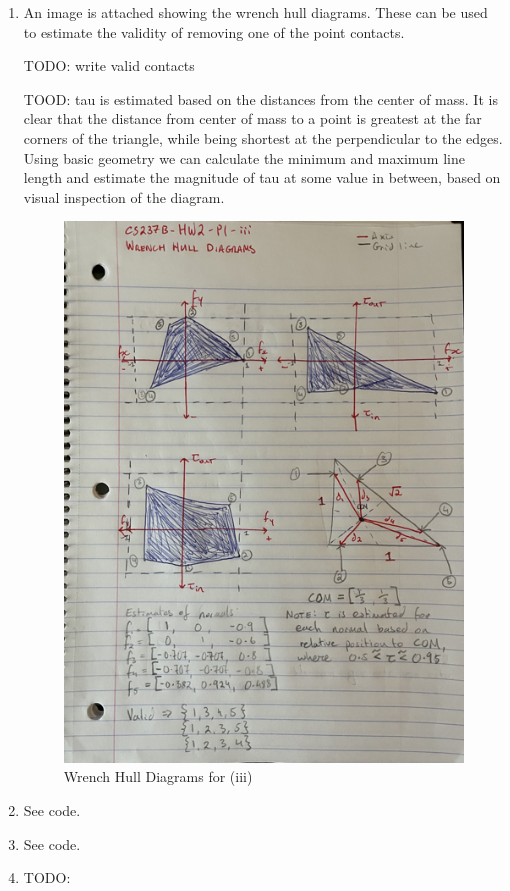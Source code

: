 \documentclass{article}
\begin{document}
\begin{enumerate}[label=(\roman*)]
\item An image is attached showing the wrench hull diagrams. These can be used to estimate the validity of removing one of the point contacts. 

TODO: write valid contacts

TOOD: tau is estimated based on the distances from the center of mass. It is clear that the distance from center of mass to a point is greatest at the far corners of the triangle, while being shortest at the perpendicular to the edges. Using basic geometry we can calculate the minimum and maximum line length and estimate the magnitude of tau at some value in between, based on visual inspection of the diagram. 

\begin{figure}
\begin{center}
\includegraphics[width=13cm,keepaspectratio]{"images/P1iii.png"}
\caption{Wrench Hull Diagrams for (iii)}
\label{fig:P1iii}
\end{center}
\end{figure}

\item See code.

\item See code.

\item TODO:

\end{enumerate}
\end{document}
